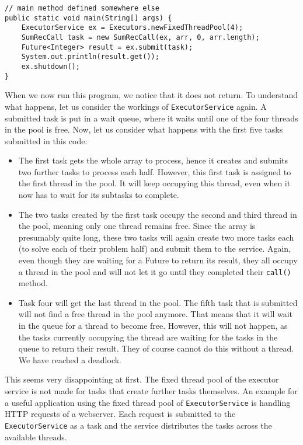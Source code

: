 \documentclass[main.tex]{subfiles}
\begin{document}
\begin{verbatim}
// main method defined somewhere else
public static void main(String[] args) {
    ExecutorService ex = Executors.newFixedThreadPool(4);
    SumRecCall task = new SumRecCall(ex, arr, 0, arr.length);
    Future<Integer> result = ex.submit(task);
    System.out.println(result.get());
    ex.shutdown();
}
\end{verbatim}
\noindent When we now run this program, we notice that it does not return. To understand what happens, let us consider the workings of \texttt{ExecutorService} again. A submitted task is put in a wait queue, where it waits until one of the four threads in the pool is free. Now, let us consider what happens with the first five tasks submitted in this code:
\begin{itemize}
  \item The first task gets the whole array to process, hence it creates and submits two further tasks to process each half. However, this first task is assigned to the first thread in the pool. It will keep occupying this thread, even when it now has to wait for its subtasks to complete.
  \item The two tasks created by the first task occupy the second and third thread in the pool, meaning only one thread remains free. Since the array is presumably quite long, these two tasks will again create two more tasks each (to solve each of their problem half) and submit them to the service. Again, even though they are waiting for a Future to return its result, they all occupy a thread in the pool and will not let it go until they completed their \texttt{call()} method.
  \item Task four will get the last thread in the pool. The fifth task that is submitted will not find a free thread in the pool anymore. That means that it will wait in the queue for a thread to become free. However, this will not happen, as the tasks currently occupying the thread are waiting for the tasks in the queue to return their result. They of course cannot do this without a thread. We have reached a deadlock.
\end{itemize}
This seems very disappointing at first. The fixed thread pool of the executor service is not made for tasks that create further tasks themselves. An example for a useful application using the fixed thread pool of \texttt{ExecutorService} is handling HTTP requests of a webserver. Each request is submitted to the \texttt{ExecutorService} as a task and the service distributes the tasks across the available threads.
\end{document}
